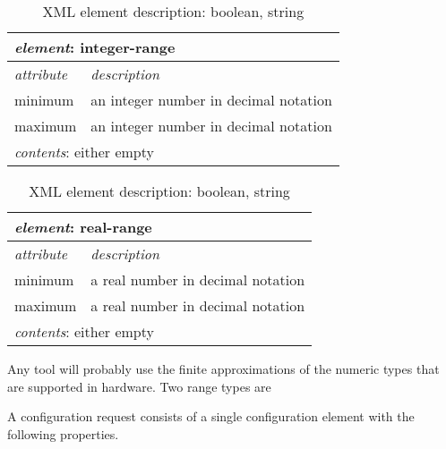 \documentclass{article}
\begin{document}
   \begin{table}[H]
    \begin{center}
    \begin{tabular}{|l|l|}
      \hline
       \multicolumn{2}{|l|}{\textit{element}: integer-range} \\
      \hline
        \textit{attribute} & \textit{description} \\
      \hline
        minimum & an integer number in decimal notation \\
        maximum & an integer number in decimal notation \\
      \hline
       \multicolumn{2}{|l|}{\textit{contents}: either empty} \\
      \hline
    \end{tabular}
    \begin{tabular}{|l|l|}
      \hline
       \multicolumn{2}{|l|}{\textit{element}: real-range} \\
      \hline
        \textit{attribute} & \textit{description} \\
      \hline
        minimum & a real number in decimal notation \\
        maximum & a real number in decimal notation \\
      \hline
       \multicolumn{2}{|l|}{\textit{contents}: either empty} \\
      \hline
    \end{tabular}
    \end{center}
    \caption{XML element description: boolean, string}
   \end{table}

   Any tool will probably use the finite approximations of the numeric types
   that are supported in hardware. Two range types are 

   A configuration request consists of a single configuration element with the
   following properties.
\end{document}
